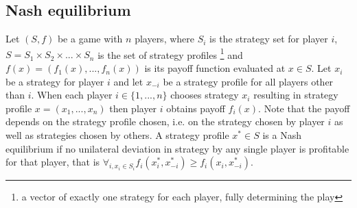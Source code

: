 \subsection*{Nash equilibrium}
Let $(S, f)$ be a game with $n$ players, where $S_i$ is the strategy set for player
$i$, $S = S_1 \times S_2 \times ... \times S_n$ is the set of strategy profiles
\footnote{
a vector of exactly one strategy for each player, fully determining the play
}
and $f(x) = (f_1(x), ..., f_n(x))$ is its payoff function evaluated at $x \in S$.
Let $x_i$ be a strategy for player $i$ and let $x_{-i}$ be a strategy profile
for all players other than $i$. When each player $i \in \{1, ..., n\}$ chooses
strategy $x_i$ resulting in strategy profile $x = (x_1, ..., x_n)$ then player $i$
obtains payoff $f_i(x)$. Note that the payoff depends on the strategy profile
chosen, i.e. on the strategy chosen by player $i$ as well as strategies chosen by
others. A strategy profile $x^{*} \in S$ is a Nash equilibrium if no unilateral
deviation in strategy by any single player is profitable for that player, that is
$\forall_{i, x_i \in S_i} f_i(x_i^{*}, x_{-i}^{*}) \geq f_i(x_i, x_{-i}^{*})$.